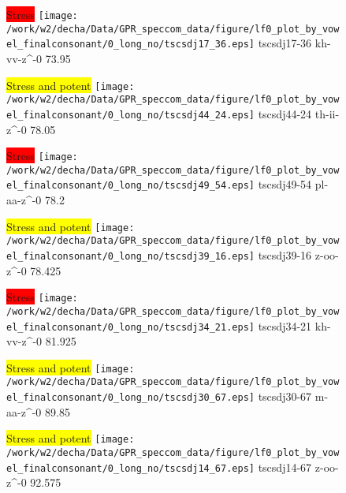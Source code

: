 \documentclass{article}
\begin{document}
\begin{figure}[t]
\begin{minipage}[b]{.24\textwidth}
\colorbox{red}{Stress}
\centering
\texttt{[image: /work/w2/decha/Data/GPR\_speccom\_data/figure/lf0\_plot\_by\_vowel\_finalconsonant/0\_long\_no/tscsdj17\_36.eps]}
tscsdj17-36 kh-vv-z\textasciicircum-0 73.95
\end{minipage}
\begin{minipage}[b]{.24\textwidth}
\colorbox{yellow}{Stress and potent}
\centering
\texttt{[image: /work/w2/decha/Data/GPR\_speccom\_data/figure/lf0\_plot\_by\_vowel\_finalconsonant/0\_long\_no/tscsdj44\_24.eps]}
tscsdj44-24 th-ii-z\textasciicircum-0 78.05
\end{minipage}
\begin{minipage}[b]{.24\textwidth}
\colorbox{red}{Stress}
\centering
\texttt{[image: /work/w2/decha/Data/GPR\_speccom\_data/figure/lf0\_plot\_by\_vowel\_finalconsonant/0\_long\_no/tscsdj49\_54.eps]}
tscsdj49-54 pl-aa-z\textasciicircum-0 78.2
\end{minipage}
\begin{minipage}[b]{.24\textwidth}
\colorbox{yellow}{Stress and potent}
\centering
\texttt{[image: /work/w2/decha/Data/GPR\_speccom\_data/figure/lf0\_plot\_by\_vowel\_finalconsonant/0\_long\_no/tscsdj39\_16.eps]}
tscsdj39-16 z-oo-z\textasciicircum-0 78.425
\end{minipage}
\end{figure}

\begin{figure}[t]
\begin{minipage}[b]{.24\textwidth}
\colorbox{red}{Stress}
\centering
\texttt{[image: /work/w2/decha/Data/GPR\_speccom\_data/figure/lf0\_plot\_by\_vowel\_finalconsonant/0\_long\_no/tscsdj34\_21.eps]}
tscsdj34-21 kh-vv-z\textasciicircum-0 81.925
\end{minipage}
\begin{minipage}[b]{.24\textwidth}
\colorbox{yellow}{Stress and potent}
\centering
\texttt{[image: /work/w2/decha/Data/GPR\_speccom\_data/figure/lf0\_plot\_by\_vowel\_finalconsonant/0\_long\_no/tscsdj30\_67.eps]}
tscsdj30-67 m-aa-z\textasciicircum-0 89.85
\end{minipage}
\begin{minipage}[b]{.24\textwidth}
\colorbox{yellow}{Stress and potent}
\centering
\texttt{[image: /work/w2/decha/Data/GPR\_speccom\_data/figure/lf0\_plot\_by\_vowel\_finalconsonant/0\_long\_no/tscsdj14\_67.eps]}
tscsdj14-67 z-oo-z\textasciicircum-0 92.575
\end{minipage}
\end{figure}
\end{document}
